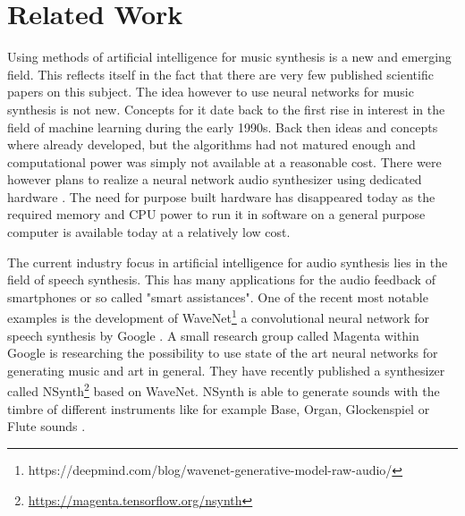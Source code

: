 \documentclass[conference]{IEEEtran}
\begin{document}
\section{Related Work}

Using methods of artificial intelligence for music synthesis is a new and emerging field.
This reflects itself in the fact that there are very few published scientific papers on this subject.
The idea however to use neural networks for music synthesis is not new.
Concepts for it date back to the first rise in interest in the field of machine learning during the early 1990s.
Back then ideas and concepts where already developed, but the algorithms had not matured enough and computational power was simply not available at a reasonable cost.
There were however plans to realize a neural network audio synthesizer using dedicated hardware \cite{holler93}.
The need for purpose built hardware has disappeared today as the required memory and CPU power to run it in software on a general purpose computer is available today at a relatively low cost.

The current industry focus in artificial intelligence for audio synthesis lies in the field of speech synthesis.
This has many applications for the audio feedback of smartphones or so called "smart assistances".
One of the recent most notable examples is the development of WaveNet\footnote{\url{}https://deepmind.com/blog/wavenet-generative-model-raw-audio/} a convolutional neural network for speech synthesis by Google \cite{wavenet16}.
A small research group called Magenta within Google is researching the possibility to use state of the art neural networks for generating music and art in general.
They have recently published a synthesizer called NSynth\footnote{\url{https://magenta.tensorflow.org/nsynth}} based on WaveNet.
NSynth is able to generate sounds with the timbre of different instruments like for example Base, Organ, Glockenspiel or Flute sounds \cite{EngelRRDESN17}.
\end{document}
